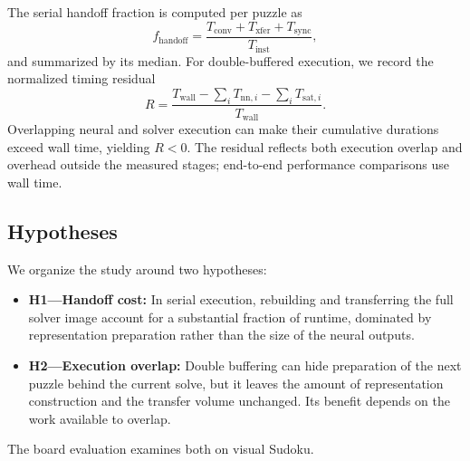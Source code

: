 The serial handoff fraction is computed per puzzle as
\begin{equation}
f_{\mathrm{handoff}}=\frac{T_{\mathrm{conv}}+T_{\mathrm{xfer}}+T_{\mathrm{sync}}}
                              {T_{\mathrm{inst}}},
\end{equation}
and summarized by its median. For double-buffered execution, we record the normalized timing residual
\begin{equation}
R=\frac{T_{\mathrm{wall}}-\sum_i T_{\mathrm{nn},i}-\sum_i T_{\mathrm{sat},i}}
           {T_{\mathrm{wall}}}.
\end{equation}
Overlapping neural and solver execution can make their cumulative durations exceed wall time, yielding $R<0$. The residual reflects both execution overlap and overhead outside the measured stages; end-to-end performance comparisons use wall time.

\subsection{Hypotheses}
We organize the study around two hypotheses:
\begin{itemize}
\item \textbf{H1---Handoff cost:} In serial execution, rebuilding and transferring the full solver image account for a substantial fraction of runtime, dominated by representation preparation rather than the size of the neural outputs.
\item \textbf{H2---Execution overlap:} Double buffering can hide preparation of the next puzzle behind the current solve, but it leaves the amount of representation construction and the transfer volume unchanged. Its benefit depends on the work available to overlap.
\end{itemize}
The board evaluation examines both on visual Sudoku.


